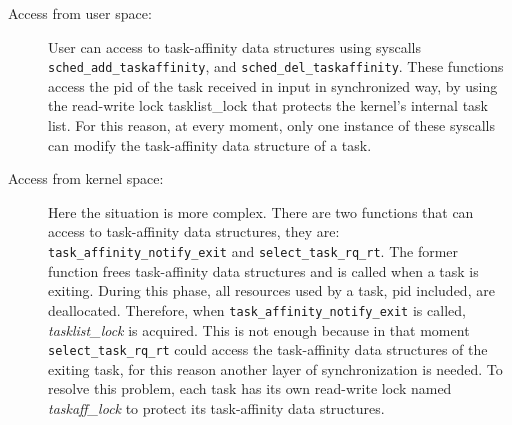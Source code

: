 \begin{description}

\item[Access from user space:] User can access to task-affinity data structures using syscalls \texttt{sched\_add\_taskaffinity}, and 
\texttt{sched\_del\_taskaffinity}. These functions access the pid of the task received in input in synchronized way, by using the read-write lock
tasklist\_lock that protects the kernel's internal task list. For this reason, at every moment, only one instance of these syscalls can modify the
task-affinity data structure of a task.

\item[Access from kernel space:] Here the situation is more complex. There are two functions that can access to task-affinity data structures, they are:
\texttt{task\_affinity\_notify\_exit} and \texttt{select\_task\_rq\_rt}. The former function frees task-affinity data structures and is called when a 
task is exiting. During this phase, all resources used by a task, pid included, are deallocated. Therefore, when \texttt{task\_affinity\_notify\_exit} is 
called, \textit{tasklist\_lock} is acquired. This is not enough because in that moment \texttt{select\_task\_rq\_rt} could access the task-affinity data 
structures of the exiting task, for this reason another layer of synchronization is needed. To resolve this problem, each task has its own read-write lock 
named \textit{taskaff\_lock} to protect its task-affinity data structures. 

\end{description}


